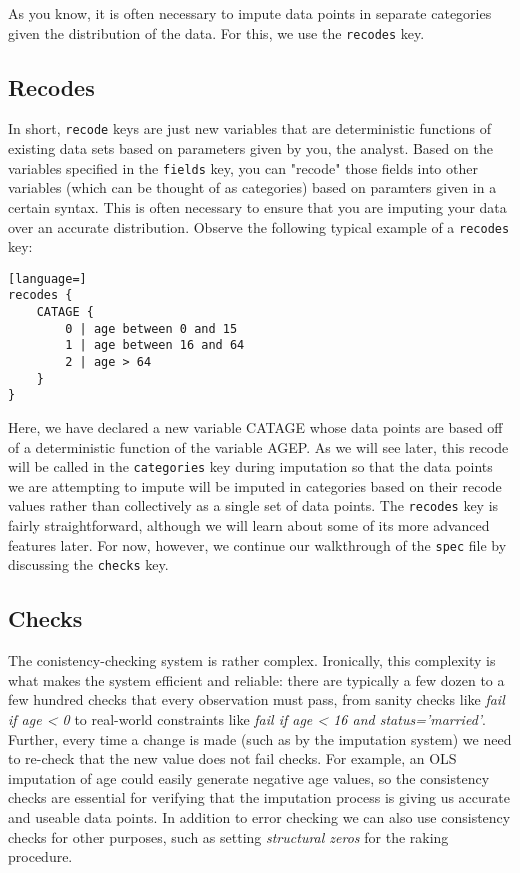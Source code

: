 \documentclass{article}
\begin{document}
As you know, it is often necessary to impute data points in separate categories given 
the distribution of the data. For this, we use the {\tt recodes} key.

\subsection{Recodes}
In short, {\tt recode} keys are just new variables that are deterministic functions of 
existing data sets based on parameters given by you, the analyst. Based on the variables specified in the 
{\tt fields} key, you can "recode" those fields into other variables (which can be thought of as categories) 
based on paramters given in a certain syntax. This is often necessary to ensure that you are imputing 
your data over an accurate distribution. Observe the following typical example of a {\tt recodes} key:

\begin{lstlisting}[language=]
recodes {
    CATAGE {
        0 | age between 0 and 15
        1 | age between 16 and 64
        2 | age > 64
    }
}
\end{lstlisting}

Here, we have declared a new variable CATAGE whose data points are based off of a 
deterministic function of the variable AGEP. As we will see later, this recode will be called 
in the {\tt categories} key during imputation so that the data points we are attempting to 
impute will be imputed in categories based on their recode values rather than collectively 
as a single set of data points. The {\tt recodes} key is fairly straightforward, although we 
will learn about some of its more advanced features later. For now, however, we continue 
our walkthrough of the {\tt spec} file by discussing the {\tt checks} key.

\subsection{Checks}
The conistency-checking system is rather complex. Ironically, this complexity is what 
makes the system efficient and reliable: there are typically a
few dozen to a few hundred checks that every observation must pass, from sanity checks
like {\em fail if age < 0} to real-world constraints like {\em fail if age < 16 and
status='married'}. Further, every time a change is made (such as by the imputation system)
we need to re-check that the new value does not fail checks. For example, an OLS imputation of age
could easily generate negative age values, so the consistency checks are essential
for verifying that the imputation process is giving us accurate and useable data points. In addition 
to error checking we can also use consistency checks for other purposes, such as setting 
{\em structural zeros} for the raking procedure.
\end{document}

